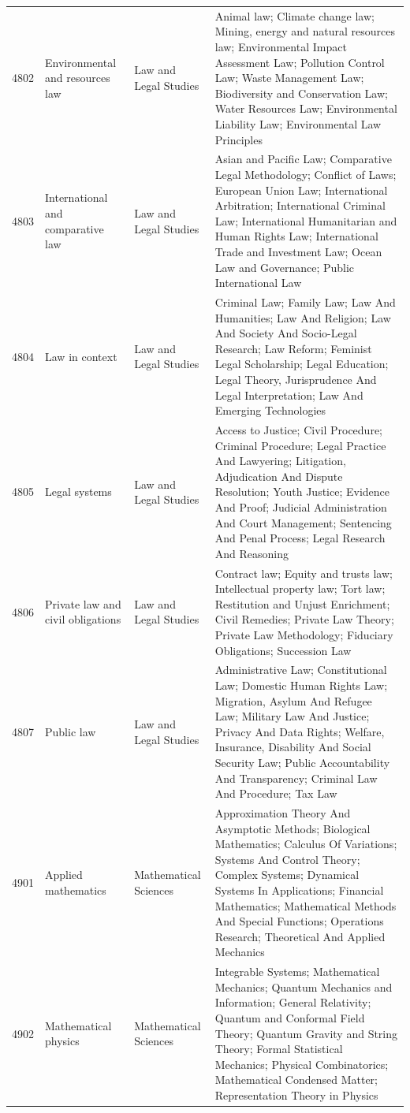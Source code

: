 \begin{longtable}{r p{2.45cm} p{2.55cm} p{6.15cm}}
4802 & Environmental and resources law & Law and Legal Studies & Animal law; Climate change law; Mining, energy and natural resources law; Environmental Impact Assessment Law; Pollution Control Law; Waste Management Law; Biodiversity and Conservation Law; Water Resources Law; Environmental Liability Law; Environmental Law Principles \\
4803 & International and comparative law & Law and Legal Studies & Asian and Pacific Law; Comparative Legal Methodology; Conflict of Laws; European Union Law; International Arbitration; International Criminal Law; International Humanitarian and Human Rights Law; International Trade and Investment Law; Ocean Law and Governance; Public International Law \\
4804 & Law in context & Law and Legal Studies & Criminal Law; Family Law; Law And Humanities; Law And Religion; Law And Society And Socio-Legal Research; Law Reform; Feminist Legal Scholarship; Legal Education; Legal Theory, Jurisprudence And Legal Interpretation; Law And Emerging Technologies \\
4805 & Legal systems & Law and Legal Studies & Access to Justice; Civil Procedure; Criminal Procedure; Legal Practice And Lawyering; Litigation, Adjudication And Dispute Resolution; Youth Justice; Evidence And Proof; Judicial Administration And Court Management; Sentencing And Penal Process; Legal Research And Reasoning \\
4806 & Private law and civil obligations & Law and Legal Studies & Contract law; Equity and trusts law; Intellectual property law; Tort law; Restitution and Unjust Enrichment; Civil Remedies; Private Law Theory; Private Law Methodology; Fiduciary Obligations; Succession Law \\
4807 & Public law & Law and Legal Studies & Administrative Law; Constitutional Law; Domestic Human Rights Law; Migration, Asylum And Refugee Law; Military Law And Justice; Privacy And Data Rights; Welfare, Insurance, Disability And Social Security Law; Public Accountability And Transparency; Criminal Law And Procedure; Tax Law \\
4901 & Applied mathematics & Mathematical Sciences & Approximation Theory And Asymptotic Methods; Biological Mathematics; Calculus Of Variations; Systems And Control Theory; Complex Systems; Dynamical Systems In Applications; Financial Mathematics; Mathematical Methods And Special Functions; Operations Research; Theoretical And Applied Mechanics \\
4902 & Mathematical physics & Mathematical Sciences & Integrable Systems; Mathematical Mechanics; Quantum Mechanics and Information; General Relativity; Quantum and Conformal Field Theory; Quantum Gravity and String Theory; Formal Statistical Mechanics; Physical Combinatorics; Mathematical Condensed Matter; Representation Theory in Physics \\

\end{longtable}
